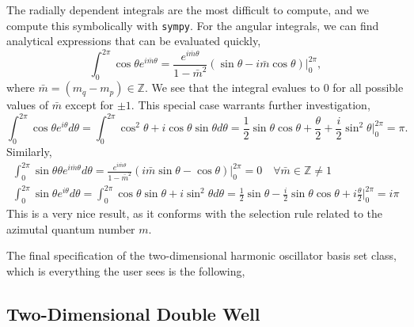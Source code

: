 The radially dependent integrals are the most difficult to compute, and we compute this 
symbolically with \lstinline{sympy}. For the angular integrals, we can find analytical 
expressions that can be evaluated quickly,
\begin{equation}
    \int_0^{2\pi} \cos \theta e^{i\bar{m} \theta} 
    = \frac{e^{i\bar{m}\theta}}{1 - \bar{m}^2}
        (\sin \theta - i \bar{m}\cos \theta)\Big\lvert_0^{2\pi},
\end{equation}
where $\bar{m} = (m_q - m_p) \in \mathbb{Z}$. We see that the integral evalues to $0$ 
for all possible values of $\bar{m}$ except for $\pm1$. This special case warrants further 
investigation,
\begin{equation}
        \int_0^{2\pi} \cos \theta e^{i\theta} d\theta 
        = \int_0^{2\pi} \cos^2\theta + i\cos\theta\sin \theta d\theta 
        = \frac{1}{2}\sin\theta\cos\theta + \frac{\theta}{2} + \frac{i}{2}\sin^2\theta
            \Big\lvert_0^{2\pi} = \pi.
\end{equation}
Similarly,
\begin{equation}
   \begin{gathered}
   \int_0^{2\pi} \sin\theta \theta e^{i\bar{m}\theta}d\theta 
    = \frac{e^{i\bar{m}\theta}}{1 - \bar{m}^2}
        (i\bar{m}\sin\theta - \cos\theta)\Big\lvert_0^{2\pi}
        = 0 \quad \forall \bar{m} \in \mathbb{Z} \neq 1 \\
    \int_0^{2\pi} \sin \theta e^{i \theta} d\theta 
    = \int_0^{2\pi} \cos\theta \sin\theta + i \sin^2\theta d\theta
    = \frac{1}{2} \sin\theta - \frac{i}{2}\sin\theta\cos\theta + i\frac{\theta}{2}
        \Big\lvert_0^{2\pi} = i\pi
   \end{gathered}
\end{equation}
This is a very nice result, as it conforms with the selection rule related to the 
azimutal quantum number $m$.

The final specification of the two-dimensional harmonic oscillator basis set class, which 
is everything the user sees is the following,



\subsection{Two-Dimensional Double Well}
\label{sec:2d_double_well}

